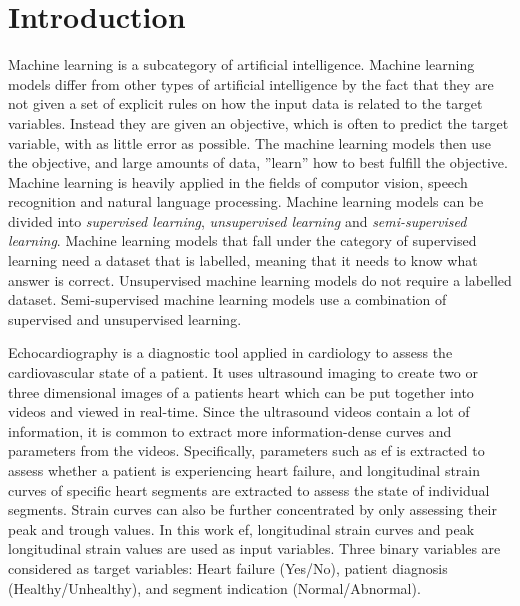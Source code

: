 \chapter{Introduction} \label{chap:intro}

Machine learning is a subcategory of artificial intelligence. Machine learning models differ from other types of artificial intelligence by the fact that they are not given a set of explicit rules on how the input data is related to the target variables. Instead they are given an objective, which is often to predict the target variable, with as little error as possible. The machine learning models then use the objective, and large amounts of data, ''learn'' how to best fulfill the objective. Machine learning is heavily applied in the fields of computor vision, speech recognition and natural language processing. Machine learning models can be divided into \textit{supervised learning}, \textit{unsupervised learning} and \textit{semi-supervised learning}. Machine learning models that fall under the category of supervised learning need a dataset that is labelled, meaning that it needs to know what answer is correct. Unsupervised machine learning models do not require a labelled dataset. Semi-supervised machine learning models use a combination of supervised and unsupervised learning. \bigskip

Echocardiography is a diagnostic tool applied in cardiology to assess the cardiovascular state of a patient. It uses ultrasound imaging to create two or three dimensional images of a patients heart which can be put together into videos and viewed in real-time. Since the ultrasound videos contain a lot of information, it is common to extract more information-dense curves and parameters from the videos. Specifically, parameters such as \acrfull{ef} is extracted to assess whether a patient is experiencing heart failure, and longitudinal strain curves of specific heart segments are extracted to assess the state of individual segments. Strain curves can also be further concentrated by only assessing their peak and trough values. In this work \acrshort{ef}, longitudinal strain curves and peak longitudinal strain values are used as input variables. Three binary variables are considered as target variables: Heart failure (Yes/No), patient diagnosis (Healthy/Unhealthy), and segment indication (Normal/Abnormal).


